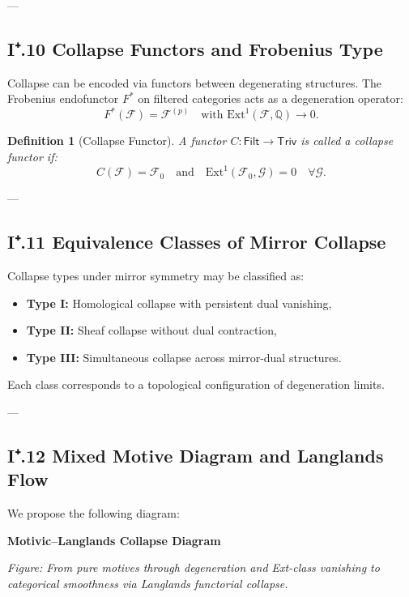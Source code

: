 \documentclass[11pt]{article}
\newtheorem{definition}[theorem]{Definition}
\begin{document}
---

\subsection*{I⁺.10 Collapse Functors and Frobenius Type}

Collapse can be encoded via functors between degenerating structures.  
The Frobenius endofunctor $F^*$ on filtered categories acts as a degeneration operator:
\[
F^*(\mathcal{F}) = \mathcal{F}^{(p)} \quad \text{with } \mathrm{Ext}^1(\mathcal{F}, \mathbb{Q}) \to 0.
\]

\begin{definition}[Collapse Functor]
A functor $C: \mathsf{Filt} \to \mathsf{Triv}$ is called a collapse functor if:
\[
C(\mathcal{F}) = \mathcal{F}_0 \quad \text{and} \quad \mathrm{Ext}^1(\mathcal{F}_0, \mathcal{G}) = 0 \quad \forall \mathcal{G}.
\]
\end{definition}

---

\subsection*{I⁺.11 Equivalence Classes of Mirror Collapse}

Collapse types under mirror symmetry may be classified as:

\begin{itemize}
  \item \textbf{Type I:} Homological collapse with persistent dual vanishing,
  \item \textbf{Type II:} Sheaf collapse without dual contraction,
  \item \textbf{Type III:} Simultaneous collapse across mirror-dual structures.
\end{itemize}

Each class corresponds to a topological configuration of degeneration limits.

---

\subsection*{I⁺.12 Mixed Motive Diagram and Langlands Flow}

We propose the following diagram:

\vspace{1.5em}
\noindent\textbf{Motivic–Langlands Collapse Diagram}

\vspace{0.5em}
\noindent
\begin{minipage}{\textwidth}
\centering
{}
\vspace{0.5em}

\small\textit{Figure: From pure motives through degeneration and Ext-class vanishing to categorical smoothness via Langlands functorial collapse.}
\end{minipage}
\end{document}
